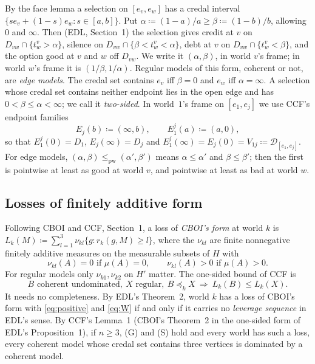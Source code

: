 \documentclass[11pt]{article}
\theoremstyle{definition}\newtheorem{definition}[theorem]{Definition}
\theoremstyle{remark}\newtheorem{remark}[theorem]{Remark}
\newcommand{\Dscr}{\mathcal D}
\begin{document}
By the face lemma a selection on $[e_v,e_w]$ has a credal interval
$\{se_v+(1-s)e_w:s\in[a,b]\}$. Put $\alpha\coloneqq(1-a)/a\ge
\beta\coloneqq(1-b)/b$, allowing $0$ and $\infty$. Then (EDL, Section~1) the
selection gives credit at $v$ on $D_{vw}\cap\{t^v_w>\alpha\}$, silence on
$D_{vw}\cap\{\beta<t^v_w<\alpha\}$, debt at $v$ on
$D_{vw}\cap\{t^v_w<\beta\}$, and the option good at $v$ and $w$ off
$D_{vw}$. We write it $(\alpha,\beta)$, in world $v$'s frame; in world $w$'s
frame it is $(1/\beta,1/\alpha)$. Regular models of this form, coherent or
not, are \emph{edge models}. The credal set contains $e_v$ iff $\beta=0$ and
$e_w$ iff $\alpha=\infty$. A selection whose credal set contains neither
endpoint lies in the open edge and has $0<\beta\le\alpha<\infty$; we call it
\emph{two-sided}. In world~$1$'s frame on $[e_1,e_j]$ we use CCF's endpoint
families
\[
 E_j(b)\coloneqq(\infty,b),\qquad E^j_1(a)\coloneqq(a,0),
\]
so that $E^j_1(0)=D_1$, $E_j(\infty)=D_j$ and
$E^j_1(\infty)=E_j(0)=V_{1j}\coloneqq\Dscr_{[e_1,e_j]}$. For edge models,
$(\alpha,\beta)\le_{\mathrm{pw}}(\alpha',\beta')$ means $\alpha\le\alpha'$ and
$\beta\le\beta'$; then the first is pointwise at least as good at world $v$,
and pointwise at least as bad at world $w$.

\subsection{Losses of finitely additive form}\label{sec:losses}

Following CBOI and CCF, Section~1, a loss of \emph{CBOI's form} at world $k$
is $L_k(M)\coloneqq\sum_{l=1}^3\nu_{kl}\{g:r_k(g,M)\ge l\}$, where the
$\nu_{kl}$ are finite nonnegative finitely additive measures on the
measurable subsets of $H$ with
\begin{equation}
 \nu_{kl}(A)=0\text{ if }\mu(A)=0,\qquad\nu_{kl}(A)>0\text{ if }\mu(A)>0.
 \label{eq:positive}
\end{equation}
For regular models only $\nu_{k1},\nu_{k2}$ on $H'$ matter. The one-sided
bound of CCF is
\begin{equation}
 B\text{ coherent undominated},\ X\text{ regular},\ B\preceq_kX
 \ \Longrightarrow\ L_k(B)\le L_k(X).
 \tag{W$_k$}\label{eq:W}
\end{equation}
It needs no completeness. By EDL's Theorem~2, world $k$ has a loss of CBOI's
form with \eqref{eq:positive} and \eqref{eq:W} if and only if it carries no
\emph{leverage sequence} in EDL's sense. By CCF's Lemma~1 (CBOI's Theorem~2
in the one-sided form of EDL's Proposition~1), if $n\ge3$, (G) and (S) hold
and every world has such a loss, every coherent model whose credal set
contains three vertices is dominated by a coherent model.
\end{document}
